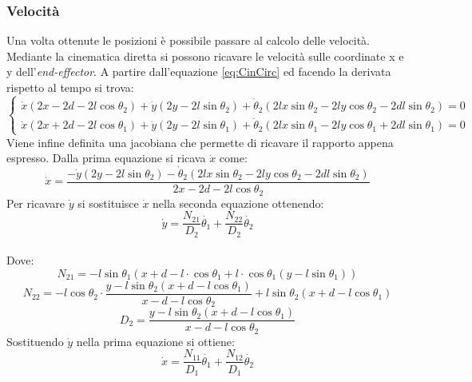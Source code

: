 \subsubsection{Velocità}\label{sec:CalcoloVelCin}
Una volta ottenute le posizioni è possibile passare al calcolo delle velocità. Mediante la cinematica diretta si possono ricavare le velocità sulle coordinate x e y dell'\textit{end-effector}. A partire dall'equazione \ref{eq:CinCirc} ed facendo la derivata rispetto al tempo si trova:
\begin{equation*}
	\begin{cases}
	\dot{x}(2x-2d-2l\cos\theta_2) +\dot{y}(2y-2l\sin\theta_2) + \dot{\theta}_2(2lx\sin\theta_2-2ly\cos\theta_2-2dl\sin\theta_2)= 0 \\
	\dot{x}(2x+2d-2l\cos\theta_1) +\dot{y}(2y-2l\sin\theta_1) + \dot{\theta}_2(2lx\sin\theta_1-2ly\cos\theta_1+2dl\sin\theta_1)= 0
	\end{cases}
\end{equation*}
 Viene infine definita una jacobiana che permette di ricavare il rapporto appena espresso. Dalla prima equazione si ricava $\dot{x}$ come:
 \begin{equation*}
 	\dot{x} = \frac{-\dot{y}(2y-2l\sin\theta_2) -\dot{\theta}_2(2lx\sin\theta_2-2ly\cos\theta_2-2dl\sin\theta_2)}{2x-2d-2l\cos\theta_2}
 \end{equation*}
Per ricavare $\dot{y}$ si sostituisce $\dot{x}$ nella seconda equazione ottenendo:
\begin{equation*}
	\dot{y} = \frac{N_{21}}{D_2}\dot{\theta_1} + \frac{N_{22}}{D_2}\dot{\theta_2}
\end{equation*}
\\Dove:
\begin{equation*}
    N_{21} = -l\sin\theta_1 (x+d-l\cdot \cos\theta_1 + l\cdot \cos\theta_1 (y-l\sin\theta_1))
\end{equation*}
\begin{equation*}
    N_{22} = -l\cos\theta_2\cdot \frac{y-l\sin\theta_2 (x+d-l\cos\theta_1)}{x-d-l \cos\theta_2} +l\sin\theta_2(x+d-l\cos\theta_1)
\end{equation*}
\begin{equation*}
 D_2 = \frac{y-l\sin\theta_2 (x+d-l\cos\theta_1)}{x-d-l\cos\theta_2}
\end{equation*}
Sostituendo $\dot{y}$ nella prima equazione si ottiene: 
\begin{equation*}
	\dot{x} = \frac{N_{11}}{D_1} \dot{\theta_1} + \frac{N_{12}}{D_1}\dot{\theta_2}
\end{equation*}
